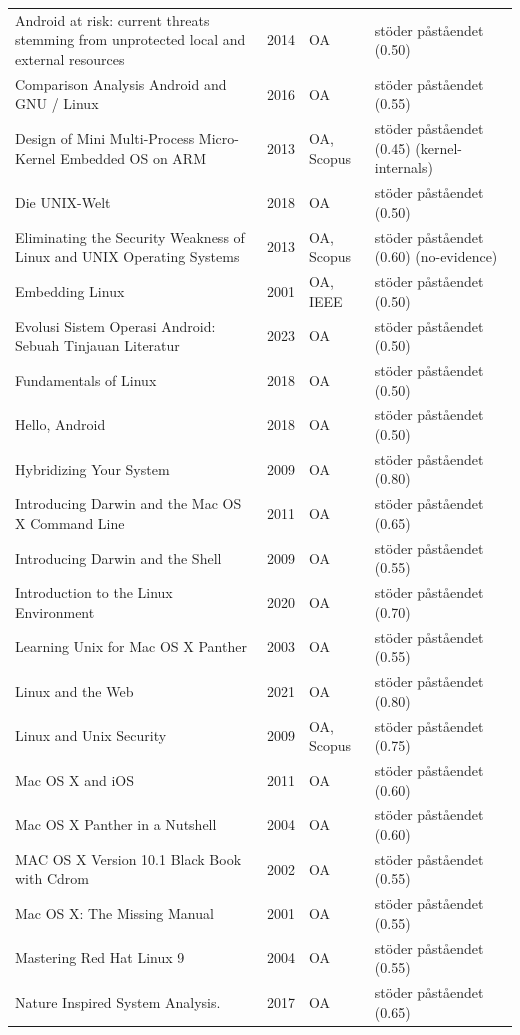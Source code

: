 \begin{longtable}{@{}%
  >{\raggedright\arraybackslash}p{}c%
  >{\raggedright\arraybackslash}p{}%
  >{\raggedright\arraybackslash}p{}@{}}
Android at risk: current threats stemming from unprotected local and external resources & 2014 & OA & stöder påståendet (0.50) \\
Comparison Analysis Android and GNU / Linux & 2016 & OA & stöder påståendet (0.55) \\
Design of Mini Multi-Process Micro-Kernel Embedded OS on ARM & 2013 & OA, Scopus & stöder påståendet (0.45) (kernel-internals) \\
Die UNIX-Welt & 2018 & OA & stöder påståendet (0.50) \\
Eliminating the Security Weakness of Linux and UNIX Operating Systems & 2013 & OA, Scopus & stöder påståendet (0.60) (no-evidence) \\
Embedding Linux & 2001 & OA, IEEE & stöder påståendet (0.50) \\
Evolusi Sistem Operasi Android: Sebuah Tinjauan Literatur & 2023 & OA & stöder påståendet (0.50) \\
Fundamentals of Linux & 2018 & OA & stöder påståendet (0.50) \\
Hello, Android & 2018 & OA & stöder påståendet (0.50) \\
Hybridizing Your System & 2009 & OA & stöder påståendet (0.80) \\
Introducing Darwin and the Mac OS X Command Line & 2011 & OA & stöder påståendet (0.65) \\
Introducing Darwin and the Shell & 2009 & OA & stöder påståendet (0.55) \\
Introduction to the Linux Environment & 2020 & OA & stöder påståendet (0.70) \\
Learning Unix for Mac OS X Panther & 2003 & OA & stöder påståendet (0.55) \\
Linux and the Web & 2021 & OA & stöder påståendet (0.80) \\
Linux and Unix Security & 2009 & OA, Scopus & stöder påståendet (0.75) \\
Mac OS X and iOS & 2011 & OA & stöder påståendet (0.60) \\
Mac OS X Panther in a Nutshell & 2004 & OA & stöder påståendet (0.60) \\
MAC OS X Version 10.1 Black Book with Cdrom & 2002 & OA & stöder påståendet (0.55) \\
Mac OS X: The Missing Manual & 2001 & OA & stöder påståendet (0.55) \\
Mastering Red Hat Linux 9 & 2004 & OA & stöder påståendet (0.55) \\
Nature Inspired System Analysis. & 2017 & OA & stöder påståendet (0.65) \\

\end{longtable}
